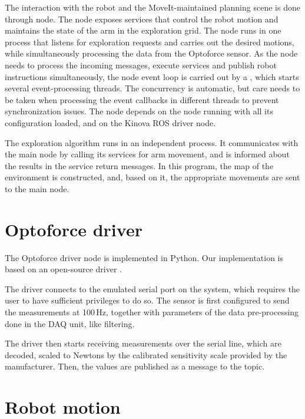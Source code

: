 \documentclass[buriama8_dp.tex]{subfiles}
\begin{document}
The interaction with the robot and the MoveIt-maintained planning scene is done through  node. The node exposes services that control the robot motion and maintains the state of the arm in the exploration grid. The node runs in one process that listens for exploration requests and carries out the desired motions, while simultaneously processing the data from the Optoforce sensor. As the node needs to process the incoming messages, execute services and publish robot instructions simultaneously, the node event loop is carried out by a , which starts several event-processing threads. The concurrency is automatic, but care needs to be taken when processing the event callbacks in different threads to prevent synchronization issues. The node depends on the  node running with all its configuration loaded, and on the Kinova ROS driver node.

The exploration algorithm runs in an independent process. It communicates with the main node by calling its services for arm movement, and is informed about the results in the service return messages. In this program, the map of the environment is constructed, and, based on it, the appropriate movements are sent to the main node.

\section{Optoforce driver}
\label{sec:opto_driver}

The Optoforce driver node is implemented in Python. Our implementation is based on an open-source driver \cite{opto_driver}.

The driver connects to the emulated serial port on the system, which requires the user to have sufficient privileges to do so. The sensor is first configured to send the measurements at 100\,Hz, together with parameters of the data pre-processing done in the DAQ unit, like filtering.

The driver then starts receiving measurements over the serial line, which are decoded, scaled to Newtons by the calibrated sensitivity scale provided by the manufacturer. Then, the values are published as a  message to the \code{\optoforce} topic.

\section{Robot motion}
\label{sec:rob_impl}
\end{document}
